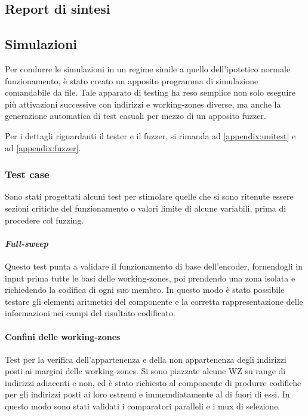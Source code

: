 \documentclass[11pt,a4paper]{article}
\begin{document}
\subsection{Report di sintesi}

\subsection{Simulazioni}
Per condurre le simulazioni in un regime simile a quello dell'ipotetico normale funzionamento, è stato creato un apposito programma di simulazione
comandabile da file. Tale apparato di testing ha reso semplice non solo eseguire più attivazioni successive con indirizzi e working-zones diverse, ma anche
la generazione automatica di test casuali per mezzo di un apposito fuzzer.

Per i dettagli riguardanti il tester e il fuzzer, si rimanda ad \ref{appendix:unitest} e ad \ref{appendix:fuzzer}.

\subsubsection{Test case}
Sono stati progettati alcuni test per stimolare quelle che si sono ritenute essere sezioni critiche del funzionamento o valori limite di alcune variabili,
prima di procedere col fuzzing.

\paragraph{\emph{Full-sweep}}
Questo test punta a validare il funzionamento di base dell'encoder, fornendogli in input prima tutte le basi delle working-zones, poi prendendo una zona
isolata e richiedendo la codifica di ogni suo membro. In questo modo è stato possibile testare gli elementi aritmetici del componente e la corretta
rappresentazione delle informazioni nei campi del risultato codificato.

\paragraph{Confini delle working-zones}
Test per la verifica dell'appartenenza e della non appartenenza degli indirizzi posti ai margini delle working-zones. Si sono piazzate alcune WZ su range
di indirizzi adiacenti e non, ed è stato richiesto al componente di produrre codifiche per gli indirizzi posti ai loro estremi e immemdiatamente al di
fuori di essi. In questo modo sono stati validati i comparatori paralleli e i mux di selezione.
\end{document}
